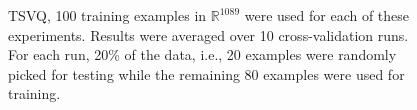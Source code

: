 \begin{figure}[h]
\caption{TSVQ, 100 training examples in $\mathbb{R}^{1089}$ were used for each of these experiments. Results were averaged over 10 cross-validation runs. For each run, 20\% of the data, i.e., 20 examples were randomly picked for testing while the remaining 80 examples were used for training.}
\label{fig:TSVQ_results}
\end{figure}
\clearpage
\newpage
\normalsize



